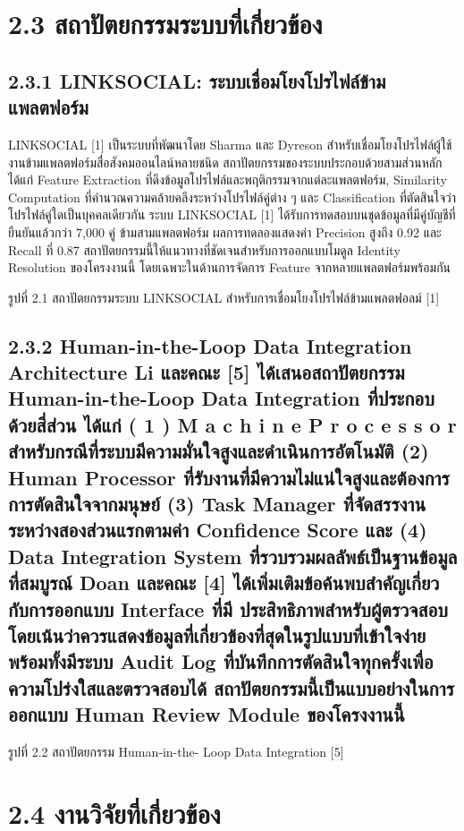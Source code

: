 \documentclass[12pt,a4paper]{report}
\begin{document}
\section*{2.3 สถาปัตยกรรมระบบที่เกี่ยวข้อง}
\subsection*{2.3.1 LINKSOCIAL: ระบบเชื่อมโยงโปรไฟล์ข้ามแพลตฟอร์ม}
LINKSOCIAL [1] เป็นระบบที่พัฒนาโดย Sharma และ Dyreson สำหรับเชื่อมโยงโปรไฟล์ผู้ใช้งานข้ามแพลตฟอร์มสื่อสังคมออนไลน์หลายชนิด สถาปัตยกรรมของระบบประกอบด้วยสามส่วนหลัก ได้แก่ Feature Extraction ที่ดึงข้อมูลโปรไฟล์และพฤติกรรมจากแต่ละแพลตฟอร์ม, Similarity Computation ที่คำนวณความคล้ายคลึงระหว่างโปรไฟล์คู่ต่าง ๆ และ Classification ที่ตัดสินใจว่าโปรไฟล์คู่ใดเป็นบุคคลเดียวกัน ระบบ LINKSOCIAL [1] ได้รับการทดสอบบนชุดข้อมูลที่มีคู่บัญชีที่ยืนยันแล้วกว่า 7,000 คู่ ข้ามสามแพลตฟอร์ม ผลการทดลองแสดงค่า Precision สูงถึง 0.92 และ Recall ที่ 0.87 สถาปัตยกรรมนี้ให้แนวทางที่ชัดเจนสำหรับการออกแบบโมดูล Identity Resolution ของโครงงานนี้ โดยเฉพาะในด้านการจัดการ Feature จากหลายแพลตฟอร์มพร้อมกัน\par
\begin{center}\small รูปที่ 2.1 สถาปัตยกรรมระบบ LINKSOCIAL สำหรับการเชื่อมโยงโปรไฟล์ข้ามแพลตฟอลม์ [1]\end{center}
\subsection*{2.3.2 Human-in-the-Loop Data Integration Architecture Li และคณะ [5] ได้เสนอสถาปัตยกรรม Human-in-the-Loop Data Integration ที่ประกอบด้วยสี่ส่วน ได้แก่ ( 1 ) M a c h i n e P r o c e s s o r สำหรับกรณีที่ระบบมีความมั่นใจสูงและดำเนินการอัตโนมัติ (2) Human Processor ที่รับงานที่มีความไม่แน่ใจสูงและต้องการการตัดสินใจจากมนุษย์ (3) Task Manager ที่จัดสรรงานระหว่างสองส่วนแรกตามค่า Confidence Score และ (4) Data Integration System ที่รวบรวมผลลัพธ์เป็นฐานข้อมูลที่สมบูรณ์ Doan และคณะ [4] ได้เพิ่มเติมข้อค้นพบสำคัญเกี่ยวกับการออกแบบ Interface ที่มี ประสิทธิภาพสำหรับผู้ตรวจสอบโดยเน้นว่าควรแสดงข้อมูลที่เกี่ยวข้องที่สุดในรูปแบบที่เข้าใจง่าย พร้อมทั้งมีระบบ Audit Log ที่บันทึกการตัดสินใจทุกครั้งเพื่อความโปร่งใสและตรวจสอบได้ สถาปัตยกรรมนี้เป็นแบบอย่างในการออกแบบ Human Review Module ของโครงงานนี้}
\clearpage
\begin{center}\small รูปที่ 2.2 สถาปัตยกรรม Human-in-the- Loop Data Integration [5]\end{center}
\section*{2.4 งานวิจัยที่เกี่ยวข้อง}
\end{document}

